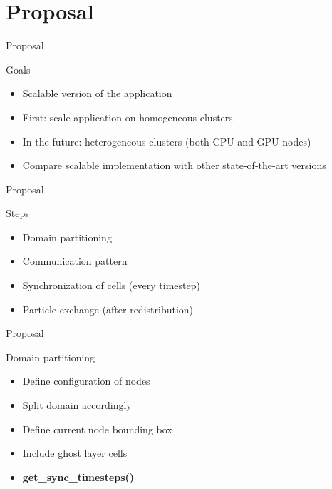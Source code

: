 \documentclass[aspectratio=43,t]{beamer}
\begin{document}
  \section{Proposal}
  \begin{frame}{Proposal}
    \begin{block}{Goals}
      \begin{itemize}
        \item Scalable version of the application
        \item First: scale application on homogeneous clusters
        \item In the future: heterogeneous clusters (both CPU and GPU nodes)
        \item Compare scalable implementation with other state-of-the-art versions
      \end{itemize}
    \end{block}
  \end{frame}

  \begin{frame}{Proposal}
    \begin{block}{Steps}
      \begin{itemize}
        \item Domain partitioning
        \item Communication pattern
        \item Synchronization of cells (every timestep)
        \item Particle exchange (after redistribution)
      \end{itemize}
    \end{block}
  \end{frame}

  \begin{frame}{Proposal}
    \begin{block}{Domain partitioning}
      \begin{itemize}
        \item Define configuration of nodes
        \item Split domain accordingly
        \item Define current node bounding box
        \item Include ghost layer cells
        \item \textbf{get\_sync\_timesteps()}
      \end{itemize}
    \end{block}
  \end{frame}
\end{document}
